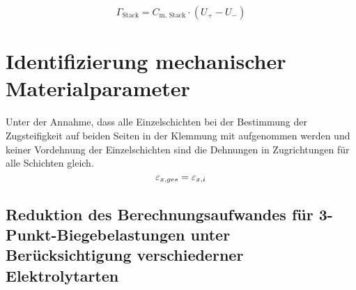 \begin{equation}
    \Gamma_{\text{Stack}} = C_{\text{m, Stack}} \cdot \left(U_{+} - U_{-}\right)
\end{equation}



\section{Identifizierung mechanischer Materialparameter}
Unter der Annahme, dass alle Einzelschichten bei der Bestimmung der Zugsteifigkeit auf beiden Seiten in der Klemmung mit aufgenommen werden und keiner Vordehnung der Einzelschichten sind die Dehnungen in Zugrichtungen für alle Schichten gleich.
\begin{equation}
    \varepsilon_{x,ges} = \varepsilon_{x,i}\\
\end{equation}



\subsection*{Reduktion des Berechnungsaufwandes für 3-Punkt-Biegebelastungen unter Berücksichtigung verschiederner Elektrolytarten}

